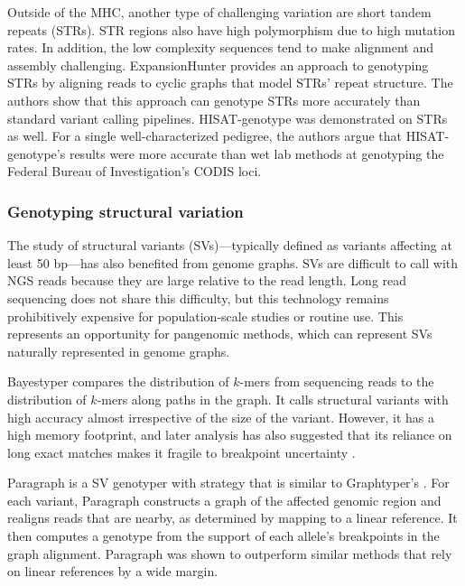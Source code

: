 Outside of the MHC, another type of challenging variation are short tandem repeats (STRs).
STR regions also have high polymorphism due to high mutation rates.
In addition, the low complexity sequences tend to make alignment and assembly challenging.
ExpansionHunter \cite{dolzhenko2019expansionhunter} provides an approach to genotyping STRs by aligning reads to cyclic graphs that model STRs' repeat structure.
The authors show that this approach can genotype STRs more accurately than standard variant calling pipelines.
HISAT-genotype \cite{Kim_2019} was demonstrated on STRs as well. 
For a single well-characterized pedigree, the authors argue that HISAT-genotype's results were more accurate than wet lab methods at genotyping the Federal Bureau of Investigation's CODIS loci.

\subsubsection{Genotyping structural variation}

The study of structural variants (SVs)---typically defined as variants affecting at least 50 bp---has also benefited from genome graphs.
SVs are difficult to call with NGS reads because they are large relative to the read length.
Long read sequencing does not share this difficulty, but this technology remains prohibitively expensive for population-scale studies or routine use.
This represents an opportunity for pangenomic methods, which can represent SVs naturally represented in genome graphs.

Bayestyper \cite{sibbesen2018accurate} compares the distribution of $k$-mers from sequencing reads to the distribution of $k$-mers along paths in the graph.
It calls structural variants with high accuracy almost irrespective of the size of the variant.
However, it has a high memory footprint, and later analysis has also suggested that its reliance on long exact matches makes it fragile to breakpoint uncertainty \cite{hickey2019genotyping}.

Paragraph \cite{chen2019paragraph} is a SV genotyper with strategy that is similar to Graphtyper's \cite{eggertsson2017graphtyper}.
For each variant, Paragraph constructs a graph of the affected genomic region and realigns reads that are nearby, as determined by mapping to a linear reference.
It then computes a genotype from the support of each allele's breakpoints in the graph alignment.
Paragraph was shown to outperform similar methods that rely on linear references by a wide margin.

